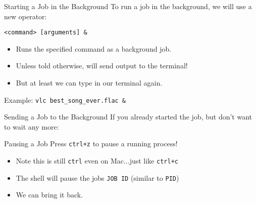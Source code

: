 \begin{frame}[fragile]{Starting a Job in the Background}
  To run a job in the background, we will use a new operator:
  \begin{block}{\colbf{\&}}
    \texttt{<command> [arguments] \&}
    \begin{itemize}
      \item Runs the specified command as a background job.
      \item Unless told otherwise, will send output to the terminal!
      \item But at least we can type in our terminal again.
    \end{itemize}
  \end{block}
  \begin{block}{Example:}
    \texttt{vlc best\_song\_ever.flac \&}
  \end{block}
\end{frame}

\begin{frame}[fragile]{Sending a Job to the Background}
  If you already started the job, but don't want to wait any more:

  \begin{block}{Pausing a Job}
    Press \texttt{ctrl+z} to pause a running process!
  \end{block}

  \begin{itemize}[<+- | alert@+>]
    \item Note this is still \texttt{ctrl} even on Mac...just like \texttt{ctrl+c}
    \item The shell will pause the jobs \texttt{JOB ID} (similar to \texttt{PID})
    \item We can bring it back.
  \end{itemize}
\end{frame}

